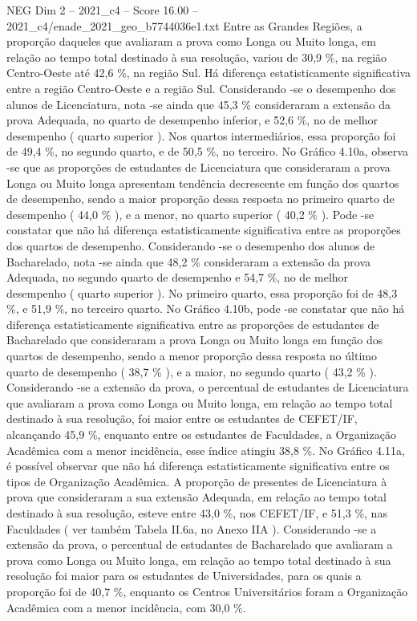 \begin{textsample}{NEG Dim 2 – 2021\_c4 – Score 16.00 – 2021\_c4/enade\_2021\_geo\_b7744036e1.txt}
Entre as Grandes Regiões, a proporção daqueles que avaliaram a prova como Longa ou Muito longa, em relação ao tempo total destinado à sua resolução, variou de 30,9 \%, na região Centro-Oeste até 42,6 \%, na região Sul.
Há diferença estatisticamente significativa entre a região Centro-Oeste e a região Sul.
Considerando -se o desempenho dos alunos de Licenciatura, nota -se ainda que 45,3 \% consideraram a extensão da prova Adequada, no quarto de desempenho inferior, e 52,6 \%, no de melhor desempenho ( quarto superior ).
Nos quartos intermediários, essa proporção foi de 49,4 \%, no segundo quarto, e de 50,5 \%, no terceiro.
No Gráfico 4.10a, observa -se que as proporções de estudantes de Licenciatura que consideraram a prova Longa ou Muito longa apresentam tendência decrescente em função dos quartos de desempenho, sendo a maior proporção dessa resposta no primeiro quarto de desempenho ( 44,0 \% ), e a menor, no quarto superior ( 40,2 \% ).
Pode -se constatar que não há diferença estatisticamente significativa entre as proporções dos quartos de desempenho.
Considerando -se o desempenho dos alunos de Bacharelado, nota -se ainda que 48,2 \% consideraram a extensão da prova Adequada, no segundo quarto de desempenho e 54,7 \%, no de melhor desempenho ( quarto superior ).
No primeiro quarto, essa proporção foi de 48,3 \%, e 51,9 \%, no terceiro quarto.
No Gráfico 4.10b, pode -se constatar que não há diferença estatisticamente significativa entre as proporções de estudantes de Bacharelado que consideraram a prova Longa ou Muito longa em função dos quartos de desempenho, sendo a menor proporção dessa resposta no último quarto de desempenho ( 38,7 \% ), e a maior, no segundo quarto ( 43,2 \% ).
Considerando -se a extensão da prova, o percentual de estudantes de Licenciatura que avaliaram a prova como Longa ou Muito longa, em relação ao tempo total destinado à sua resolução, foi maior entre os estudantes de CEFET/IF, alcançando 45,9 \%, enquanto entre os estudantes de Faculdades, a Organização Acadêmica com a menor incidência, esse índice atingiu 38,8 \%.
No Gráfico 4.11a, é possível observar que não há diferença estatisticamente significativa entre os tipos de Organização Acadêmica.
A proporção de presentes de Licenciatura à prova que consideraram a sua extensão Adequada, em relação ao tempo total destinado à sua resolução, esteve entre 43,0 \%, nos CEFET/IF, e 51,3 \%, nas Faculdades ( ver também Tabela II.6a, no Anexo IIA ).
Considerando -se a extensão da prova, o percentual de estudantes de Bacharelado que avaliaram a prova como Longa ou Muito longa, em relação ao tempo total destinado à sua resolução foi maior para os estudantes de Universidades, para os quais a proporção foi de 40,7 \%, enquanto os Centros Universitários foram a Organização Acadêmica com a menor incidência, com 30,0 \%.

\end{textsample}
